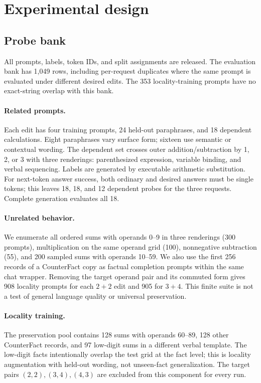 \documentclass[10pt,twocolumn]{article}
\begin{document}
\section{Experimental design}
\subsection{Probe bank}
All prompts, labels, token IDs, and split assignments are released. The evaluation bank has 1,049 rows, including per-request duplicates where the same prompt is evaluated under different desired edits. The 353 locality-training prompts have no exact-string overlap with this bank.

\paragraph{Related prompts.}
Each edit has four training prompts, 24 held-out paraphrases, and 18 dependent calculations. Eight paraphrases vary surface form; sixteen use semantic or contextual wording. The dependent set crosses outer addition/subtraction by 1, 2, or 3 with three renderings: parenthesized expression, variable binding, and verbal sequencing. Labels are generated by executable arithmetic substitution. For next-token answer success, both ordinary and desired answers must be single tokens; this leaves 18, 18, and 12 dependent probes for the three requests. Complete generation evaluates all 18.

\paragraph{Unrelated behavior.}
We enumerate all ordered sums with operands 0--9 in three renderings (300 prompts), multiplication on the same operand grid (100), nonnegative subtraction (55), and 200 sampled sums with operands 10--59. We also use the first 256 records of a CounterFact copy \citep{counterfactcopy} as factual completion prompts within the same chat wrapper. Removing the target operand pair and its commuted form gives 908 locality prompts for each $2+2$ edit and 905 for $3+4$. This finite suite is not a test of general language quality or universal preservation.

\paragraph{Locality training.}
The preservation pool contains 128 sums with operands 60--89, 128 other CounterFact records, and 97 low-digit sums in a different verbal template. The low-digit facts intentionally overlap the test grid at the fact level; this is locality augmentation with held-out wording, not unseen-fact generalization. The target pairs $(2,2),(3,4),(4,3)$ are excluded from this component for every run.
\end{document}
